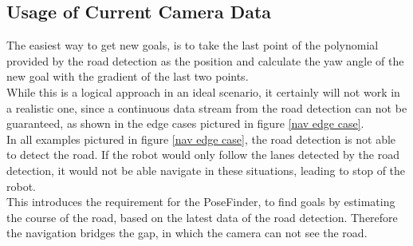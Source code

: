 \subsection{Usage of Current Camera Data}


The easiest way to get new goals, is to take the last point of the polynomial provided by the road detection as the position and calculate the yaw angle of the new goal with the gradient of the last two points.\\

While this is a logical approach in an ideal scenario, it certainly will not work in a realistic one, since a continuous data stream from the road detection can not be guaranteed, as shown in the edge cases pictured in figure \ref{nav edge case}.\\

In all examples pictured in figure \ref{nav edge case}, the road detection is not able to detect the road. If the robot would only follow the lanes detected by the road detection, it would not be able navigate in these situations, leading to stop of the robot.\\

This introduces the requirement for the PoseFinder, to find goals by estimating the course of the road, based on the latest data of the road detection. Therefore the navigation bridges the gap, in which the camera can not see the road.\\


